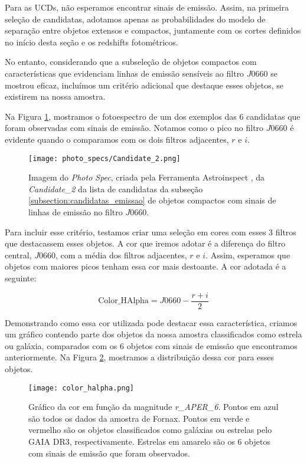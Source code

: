 Para as UCDs, não esperamos encontrar sinais de emissão. Assim, na primeira seleção de candidatas, adotamos apenas as probabilidades do modelo de separação entre objetos extensos e compactos, juntamente com os cortes definidos no início desta seção e os redshifts fotométricos.

No entanto, considerando que a subseleção de objetos compactos com características que evidenciam linhas de emissão sensíveis ao filtro $J0660$ se mostrou eficaz, incluímos um critério adicional que destaque esses objetos, se existirem na nossa amostra.

Na Figura \ref{ex_photospec_f600}, mostramos o fotoespectro de um dos exemplos das 6 candidatas que foram observadas com sinais de emissão. Notamos como o pico no filtro $J0660$ é evidente quando o comparamos com os dois filtros adjacentes, $r$ e $i$.

\begin{figure}[!ht]
    \begin{center}
    \texttt{[image: photo\_specs/Candidate\_2.png]}
    \caption[]{Imagem do \textit{Photo Spec}, criada pela Ferramenta Astroinspect \cite{astroinspect}, da \textit{Candidate\_2} da lista de candidatas da subseção \ref{subsection:candidatas_emissao} de objetos compactos com sinais de linhas de emissão no filtro $J0660$.}
    \label{ex_photospec_f600}
    \end{center}
\end{figure}

Para incluir esse critério, testamos criar uma seleção em cores com esses 3 filtros que destacassem esses objetos. A cor que iremos adotar é a diferença do filtro central, $J0660$, com a média dos filtros adjacentes, $r$ e $i$. Assim, esperamos que objetos com maiores picos tenham essa cor mais destoante. A cor adotada é a seguinte:

\begin{equation}
    \text{Color\_HAlpha} = J0660 - \frac{r + i}{2}
    \label{equantion_halpha_color}
\end{equation}

Demonstrando como essa cor utilizada pode destacar essa característica, criamos um gráfico contendo parte dos objetos da nossa amostra classificados como estrela ou galáxia, comparados com os 6 objetos com sinais de emissão que encontramos anteriormente. Na Figura \ref{color_halpha}, mostramos a distribuição dessa cor para esses objetos.

\begin{figure}[!ht]
    \begin{center}
    \texttt{[image: color\_halpha.png]}
    \caption[]{Gráfico da cor  em função da magnitude \textit{r\_APER\_6}. Pontos em azul são todos os dados da amostra de Fornax. Pontos em verde e vermelho são os objetos classificados como galáxias ou estrelas pelo GAIA DR3, respectivamente. Estrelas em amarelo são os 6 objetos com sinais de emissão que foram observados.}
    \label{color_halpha}
    \end{center}
\end{figure}

